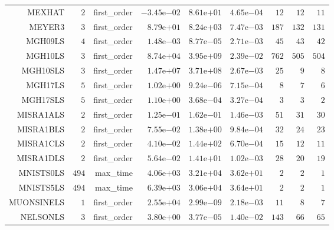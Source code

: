 \begin{longtable}{rrrrrrrrr}
MEXHAT & \(     2\) & first\_order & \(-3.45\)e\(-02\) & \( 8.61\)e\(+01\) & \( 4.65\)e\(-04\) & \(    12\) & \(    12\) & \(    11\) \\
MEYER3 & \(     3\) & first\_order & \( 8.79\)e\(+01\) & \( 8.24\)e\(+03\) & \( 7.47\)e\(-03\) & \(   187\) & \(   132\) & \(   131\) \\
MGH09LS & \(     4\) & first\_order & \( 1.48\)e\(-03\) & \( 8.77\)e\(-05\) & \( 2.71\)e\(-03\) & \(    45\) & \(    43\) & \(    42\) \\
MGH10LS & \(     3\) & first\_order & \( 8.74\)e\(+04\) & \( 3.95\)e\(+09\) & \( 2.39\)e\(-02\) & \(   762\) & \(   505\) & \(   504\) \\
MGH10SLS & \(     3\) & first\_order & \( 1.47\)e\(+07\) & \( 3.71\)e\(+08\) & \( 2.67\)e\(-03\) & \(    25\) & \(     9\) & \(     8\) \\
MGH17LS & \(     5\) & first\_order & \( 1.02\)e\(+00\) & \( 9.24\)e\(-06\) & \( 7.15\)e\(-04\) & \(     8\) & \(     7\) & \(     6\) \\
MGH17SLS & \(     5\) & first\_order & \( 1.10\)e\(+00\) & \( 3.68\)e\(-04\) & \( 3.27\)e\(-04\) & \(     3\) & \(     3\) & \(     2\) \\
MISRA1ALS & \(     2\) & first\_order & \( 1.25\)e\(-01\) & \( 1.62\)e\(-01\) & \( 1.46\)e\(-03\) & \(    51\) & \(    31\) & \(    30\) \\
MISRA1BLS & \(     2\) & first\_order & \( 7.55\)e\(-02\) & \( 1.38\)e\(+00\) & \( 9.84\)e\(-04\) & \(    32\) & \(    24\) & \(    23\) \\
MISRA1CLS & \(     2\) & first\_order & \( 4.10\)e\(-02\) & \( 1.44\)e\(+02\) & \( 6.70\)e\(-04\) & \(    15\) & \(    12\) & \(    11\) \\
MISRA1DLS & \(     2\) & first\_order & \( 5.64\)e\(-02\) & \( 1.41\)e\(+01\) & \( 1.02\)e\(-03\) & \(    28\) & \(    20\) & \(    19\) \\
MNISTS0LS & \(   494\) & max\_time & \( 4.06\)e\(+03\) & \( 3.21\)e\(+04\) & \( 3.62\)e\(+01\) & \(     2\) & \(     2\) & \(     1\) \\
MNISTS5LS & \(   494\) & max\_time & \( 6.39\)e\(+03\) & \( 3.06\)e\(+04\) & \( 3.64\)e\(+01\) & \(     2\) & \(     2\) & \(     1\) \\
MUONSINELS & \(     1\) & first\_order & \( 2.55\)e\(+04\) & \( 2.99\)e\(-09\) & \( 2.18\)e\(-03\) & \(    11\) & \(     8\) & \(     7\) \\
NELSONLS & \(     3\) & first\_order & \( 3.80\)e\(+00\) & \( 3.77\)e\(-05\) & \( 1.40\)e\(-02\) & \(   143\) & \(    66\) & \(    65\) \\

\end{longtable}
